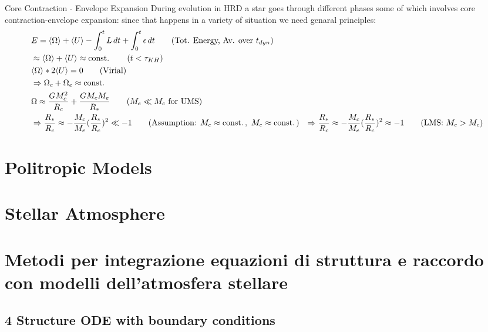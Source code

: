 \begin{frame}{Core Contraction - Envelope Expansion}
    During evolution in HRD a star goes through different phases some of which involves core contraction-envelope expansion: since that happens in a variety of situation we need genaral principles:
    \begin{align*}
        &E=\exv{\Omega}+\exv{U}-\int_0^tL\,dt+\int_0^t\epsilon\,dt\tag{Tot. Energy, Av. over $t_{dyn}$}\\
        &\approx\exv{\Omega}+\exv{U}\approx\const{}\tag{$t<\tkh{}$}\\
        &\exv{\Omega}*2\exv{U}=0\tag{Virial}\\
        &\Rightarrow\Omega_c+\Omega_e\approx\const{}\\
        &\Omega\approx \frac{GM_c^2}{R_c}+\frac{GM_cM_e}{R_*}\tag{$M_e\ll M_c$ for UMS}\\
        &\Rightarrow \frac{R_*}{R_c}\approx-\frac{M_c}{M_e}(\frac{R_*}{R_c})^2\ll-1\tag{Assumption: $M_c\approx\const{},\ M_e\approx\const{}$}
        &\Rightarrow \frac{R_*}{R_c}\approx-\frac{M_c}{M_e}(\frac{R_*}{R_c})^2\approx-1\tag{LMS: $M_e>M_c$}
    \end{align*}
\end{frame}

\section{Politropic Models}

\section{Stellar Atmosphere}


\section{Metodi per integrazione equazioni di struttura e raccordo con modelli dell'atmosfera stellare}

\subsection{4 Structure ODE with boundary conditions}

